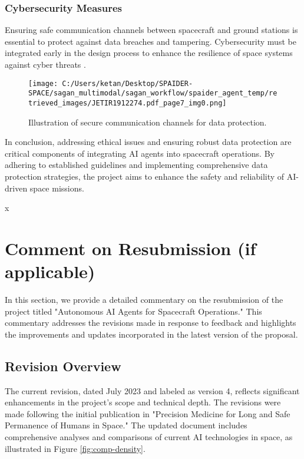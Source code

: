 \documentclass[a4paper,12pt]{article}
\begin{document}
\subsubsection{Cybersecurity Measures}

Ensuring safe communication channels between spacecraft and ground stations is essential to protect against data breaches and tampering. Cybersecurity must be integrated early in the design process to enhance the resilience of space systems against cyber threats \cite{cybersecurity_measures}.

\begin{figure}[htbp]
    \centering
    \texttt{[image: C:/Users/ketan/Desktop/SPAIDER-SPACE/sagan\_multimodal/sagan\_workflow/spaider\_agent\_temp/retrieved\_images/JETIR1912274.pdf\_page7\_img0.png]}
    \caption{Illustration of secure communication channels for data protection.}
    \label{fig:secure_communication}
\end{figure}

In conclusion, addressing ethical issues and ensuring robust data protection are critical components of integrating AI agents into spacecraft operations. By adhering to established guidelines and implementing comprehensive data protection strategies, the project aims to enhance the safety and reliability of AI-driven space missions.






x
\section{Comment on Resubmission (if applicable)}

In this section, we provide a detailed commentary on the resubmission of the project titled "Autonomous AI Agents for Spacecraft Operations." This commentary addresses the revisions made in response to feedback and highlights the improvements and updates incorporated in the latest version of the proposal.

\subsection{Revision Overview}

The current revision, dated July 2023 and labeled as version 4, reflects significant enhancements in the project's scope and technical depth. The revisions were made following the initial publication in "Precision Medicine for Long and Safe Permanence of Humans in Space." The updated document includes comprehensive analyses and comparisons of current AI technologies in space, as illustrated in Figure \ref{fig:comp-density}.
\end{document}
